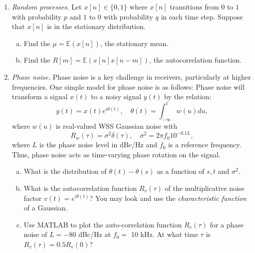 \documentclass[11pt]{article}
\def\Exp{\mathbb{E}}
\begin{document}
\begin{enumerate}
\item \emph{Random processes.}  
Let $x[n] \in \{0,1\}$ where $x[n]$ transitions from $0$ to $1$
with probability $p$ and $1$ to $0$ with probability $q$ in each time step.
Suppose that $x[n]$ is in the stationary distribution.
\begin{enumerate}[(a)]
\item Find the $\mu = \Exp(x[n])$, the stationary mean.

\item Find the $R[m] = \Exp(x[n]x[n-m])$, the autocorrelation function.
\end{enumerate}

\item \emph{Phase noise.}  Phase noise is a key challenge in receivers,
particularly at higher frequencies.  One simple model
for phase noise is as follows:  Phase noise will transform a signal $x(t)$ 
to a noisy signal $y(t)$ by the relation:
\[
    y(t) = x(t)e^{i\theta(t)}, \quad 
    \theta(t) = \int_{-\infty}^t w(u)du,
\]
where $w(u)$ is real-valued WSS Gaussian noise with 
\[
    R_w(\tau) = \sigma^2\delta(\tau), \quad 
    \sigma^2 = 2\pi f_0 10^{-0.1L},
\]
where $L$ is the phase noise level in dBc/Hz and $f_0$ is a reference frequency.
Thus, phase noise acts as time-varying phase rotation on the signal.
\begin{enumerate}[(a)]
\item What is the distribution of $\theta(t)-\theta(s)$ as a function of 
$s,t$ and $\sigma^2$.

\item What is the autocorrelation function $R_v(\tau)$ 
of the multiplicative noise factor $v(t) = e^{i\theta(t)}$?  You may
look and use the \emph{characteristic function} of a Gaussian.
    
\item Use MATLAB to plot the auto-correlation function $R_v(\tau)$ for a 
phase noise of $L= - 80$ dBc/Hz at $f_0=$ 10 kHz.  At what time $\tau$
is $R_v(\tau)=0.5 R_v(0)$?

\end{enumerate}



\end{enumerate}
\end{document}
